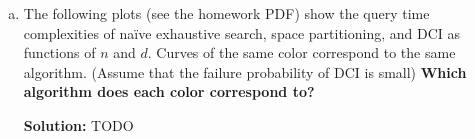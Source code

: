 \documentclass{article}
\newenvironment{solution}{\color{blue} \smallskip \textbf{Solution:}}{}
\begin{document}
\begin{enumerate}[(a)]
    \begin{solution}
        TODO
    \end{solution}

    \newpage
    \item
    The following plots (see the homework PDF) show the query time complexities of na\"{i}ve exhaustive search, space partitioning, and DCI as functions of $n$ and $d$. 
    Curves of the same color correspond to the same algorithm. (Assume that the failure probability of DCI is small) {\bf Which algorithm does each color correspond to?}

    
    \begin{solution}
        TODO
    \end{solution}
\end{enumerate}
\end{document}
